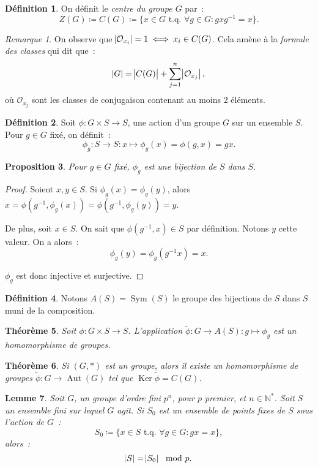 \documentclass{article}
\newtheorem{thm}{Théorème}[section]
\newtheorem{prp}[thm]{Proposition}
\newtheorem{lem}[thm]{Lemme}
\theoremstyle{definition}
\newtheorem{déf}[thm]{Définition}
\theoremstyle{remark}
\newtheorem*{rmq}{Remarque}
\DeclareMathOperator{\Ker}{Ker}
\DeclareMathOperator{\Aut}{Aut}
\DeclareMathOperator{\Sym}{Sym}
\newcommand{\N}{\mathbb N}
\newcommand{\tq}{\text{ t.q. }}
\begin{document}
	\begin{déf} On définit le \textit{centre du groupe $G$} par~:
	\[Z(G) \coloneqq C(G) \coloneqq \{x \in G \tq \forall g \in G : gxg^{-1} = x\}.\]
	\end{déf}

	\begin{rmq} On observe que $\abs {\mathcal O_{x_i}} = 1 \iff x_i \in C(G)$. Cela amène à la \textit{formule des classes} qui dit que~:
	\[\abs G = \abs {C(G)} + \sum_{j=1}^n\abs {\mathcal O_{x_j}},\]
	où $\mathcal O_{x_j}$ sont les classes de conjugaison contenant au moins 2 éléments.
	\end{rmq}

	\begin{déf} Soit $\phi : G \times S \to S$, une action d'un groupe $G$ sur un ensemble $S$. Pour $g \in G$ fixé, on définit~:
	\[\phi_g : S \to S : x \mapsto \phi_g(x) = \phi(g, x) = gx.\]
	\end{déf}

	\begin{prp} Pour $g \in G$ fixé, $\phi_g$ est une bijection de $S$ dans $S$.
	\end{prp}

	\begin{proof} Soient $x, y \in S$. Si $\phi_g(x) = \phi_g(y)$, alors $x = \phi(g^{-1}, \phi_g(x)) = \phi(g^{-1}, \phi_g(y)) = y$.

	De plus, soit $x \in S$. On sait que $\phi(g^{-1}, x) \in S$ par définition. Notons $y$ cette valeur. On a alors~:
	\[\phi_g(y) = \phi_g(g^{-1}x) = x.\]

	$\phi_g$ est donc injective et surjective.
	\end{proof}

	\begin{déf} Notons $A(S) = \Sym(S)$ le groupe des bijections de $S$ dans $S$ muni de la composition.
	\end{déf}

	\begin{thm} Soit $\phi : G \times S \to S$. L'application $\widetilde \phi : G \to A(S) : g \mapsto \phi_g$ est un homomorphisme de groupes.
	\end{thm}

	\begin{thm} Si $(G, *)$ est un groupe, alors il existe un homomorphisme de groupes $\widetilde \phi : G \to \Aut(G)$ tel que $\Ker \widetilde \phi = C(G)$.
	\end{thm}

	\begin{lem}\label{lem:|S|=|S_0|} Soit $G$, un groupe d'ordre fini $p^n$, pour $p$ premier, et $n \in \N^*$. Soit $S$ un ensemble fini sur lequel $G$ agit.
	Si $S_0$ est un ensemble de points fixes de $S$ sous l'action de $G$~:
	\[S_0 \coloneqq \{x \in S \tq \forall g \in G : gx = x\},\]
	alors~:
	\[\abs S = \abs {S_0} \mod p.\]
	\end{lem}
\end{document}
